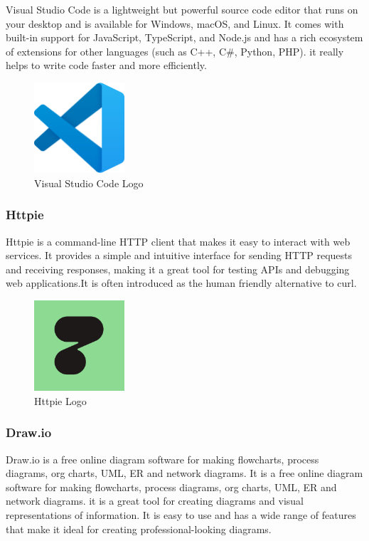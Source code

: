 Visual Studio Code is a lightweight but powerful source code editor that runs
on your desktop and is available for Windows, macOS, and Linux. It comes with
built-in support for JavaScript, TypeScript, and Node.js and has a rich
ecosystem of extensions for other languages (such as C++, C\#, Python, PHP). it really
helps to write code faster and more efficiently.
\begin{figure}[h!]
      \centering
      \includegraphics[width=0.3\textwidth]{images/vscode.png}
      \caption{Visual Studio Code Logo}
      \label{fig:vscode}
\end{figure}

\subsubsection{Httpie}

Httpie is a command-line HTTP client that makes it easy to interact with web
services. It provides a simple and intuitive interface for sending HTTP
requests and receiving responses, making it a great tool for testing APIs and
debugging web applications.It is often introduced as the human friendly alternative to curl.

\begin{figure}[h!]
      \centering
      \includegraphics[width=0.3\textwidth]{images/httpie.png}
      \caption{Httpie Logo}
      \label{fig:httpie}
\end{figure}


\subsubsection{Draw.io}
Draw.io is a free online diagram software for making flowcharts, process
diagrams, org charts, UML, ER and network diagrams. It is a free online diagram
software for making flowcharts, process diagrams, org charts, UML, ER and
network diagrams.
it is a great tool for creating diagrams and visual representations of
information. It is easy to use and has a wide range of features that make it
ideal for creating professional-looking diagrams.



